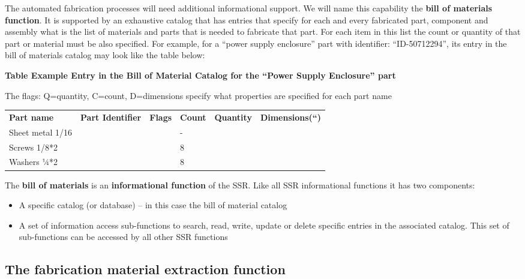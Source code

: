\hypertarget{RefHeading3062306210128}{}The automated fabrication
processes will need additional informational support. We will name this
capability the \textbf{bill of materials function}. It is supported by
an exhaustive catalog that has entries that specify for each and every
fabricated part, component and assembly what is the list of materials
and parts that is needed to fabricate that part. For each item in this
list the count or quantity of that part or material must be also
specified. For example, for a “power supply enclosure” part with
identifier:  “ID-50712294”, its entry in the bill of materials catalog
may look like the table below:

{\bfseries
Table  Example Entry in the Bill of Material Catalog for the
``Power Supply Enclosure'' part}

The flags: Q=quantity, C=count, D=dimensions specify what properties are
specified for each part name


\bigskip

\begin{flushleft}
\tablehead{}
\begin{supertabular}{|m{1.3094599in}m{1.3573599in}m{0.9837598in}m{0.6705598in}m{0.82335985in}m{1.0323598in}|}
\hline
\textbf{Part name} &
\textbf{Part Identifier} &
\textbf{Flags} &
\textbf{Count} &
\textbf{Quantity} &
\textbf{Dimensions(“)}\\
Sheet metal  1/16 &
~
 &
~
 &
{}- &
~
 &
~
\\
Screws 1/8*2 &
~
 &
~
 &
8 &
~
 &
~
\\
Washers  ¼*2 &
~
 &
~
 &
8 &
~
 &
~
\\\hline
\end{supertabular}
\end{flushleft}

The \textbf{bill of materials} is an \textbf{informational function} of
the SSR. Like all SSR informational functions it has two components:

\begin{itemize}
\item A specific catalog (or database) – in this case the bill of
material catalog
\item A set of information access sub-functions to search, read, write,
update or delete specific entries in the associated catalog. This set
of sub-functions can be accessed by all other SSR functions 
\end{itemize}

\subsection[The fabrication material extraction function ]{The
fabrication material extraction function }

